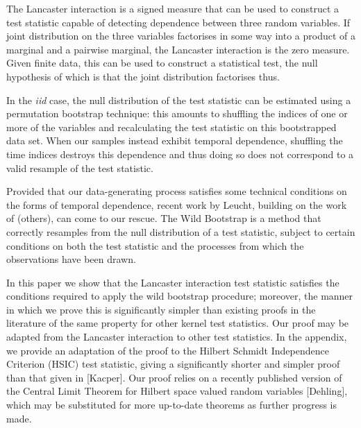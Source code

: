 \documentclass[]{article}
\begin{document}
The Lancaster interaction is a signed measure that can be used to construct a test statistic capable of detecting dependence between three random variables. If joint distribution on the three variables factorises in some way into a product of a marginal and a pairwise marginal, the Lancaster interaction is the zero measure. Given finite data, this can be used to construct a statistical test, the null hypothesis of which is that the joint distribution factorises thus. 	

In the \emph{iid} case, the null distribution of the test statistic can be estimated using a permutation bootstrap technique: this amounts to shuffling the indices of one or more of the variables and recalculating the test statistic on this bootstrapped data set. When our samples instead exhibit temporal dependence, shuffling the time indices destroys this dependence and thus doing so does not correspond to a valid resample of the test statistic. 

Provided that our data-generating process satisfies some technical conditions on the forms of temporal dependence, recent work by Leucht, building on the work of (others), can come to our rescue. The Wild Bootstrap is a method that correctly resamples from the null distribution of a test statistic, subject to certain conditions on both the test statistic and the processes from which the observations have been drawn.

In this paper we show that the Lancaster interaction test statistic satisfies the conditions required to apply the wild bootstrap procedure; moreover, the manner in which we prove this is significantly simpler than existing proofs in the literature of the same property for other kernel test statistics. Our proof may be adapted from the Lancaster interaction to other test statistics. In the appendix, we provide an adaptation of the proof to the Hilbert Schmidt Independence Criterion (HSIC) test statistic, giving a significantly shorter and simpler proof than that given in [Kacper]. Our proof relies on a recently published version of the Central Limit Theorem for Hilbert space valued random variables [Dehling], which may be substituted for more up-to-date theorems as further progress is made.
\end{document}
